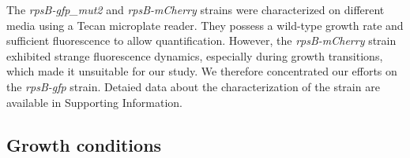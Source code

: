 The \textit{rpsB-gfp\_mut2} and \textit{rpsB-mCherry} strains were
characterized on different media using a Tecan microplate reader.
They possess a wild-type growth rate and sufficient fluorescence to
allow quantification. However, the \textit{rpsB-mCherry} strain exhibited
strange fluorescence dynamics, especially during growth transitions,
which made it unsuitable for our study. We therefore concentrated
our efforts on the \textit{rpsB-gfp} strain. Detaied data about the
characterization of the strain are available in Supporting Information.

\subsection{Growth conditions}

\label{sec:growth_condition}

